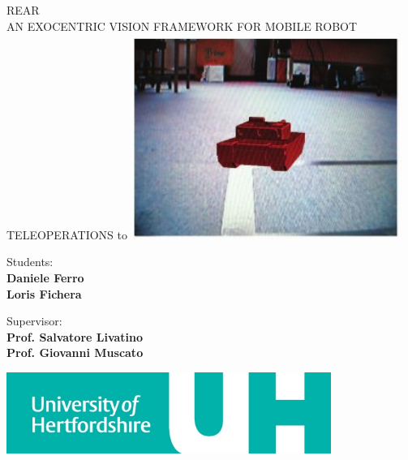 \begin{titlepage}
  \begin{center}
    \uppercase{ \textsf{
        \LARGE{REAR} \\ 
        \vspace{0.5truecm}
        \large{an exocentric vision framework for mobile robot teleoperations}
    }}
    \hbox to \textwidth{\hrulefill}
    \vfill
    \includegraphics[width=250pt]{img/virtual_exocentric.jpg}
    \vfill
    
    \begin{flushright}
      \textsf{Students:} \\
      \textsf{\textbf{Daniele Ferro}} \\                      
      \textsf{\textbf{Loris Fichera}}
      \vspace{0.5 truecm}
                
      \textsf{Supervisor:} \\
      \textsf{\textbf{Prof. Salvatore Livatino }}\\
      \textsf{\textbf{Prof. Giovanni Muscato }}\\
    \end{flushright}
    
    \vspace{0.5 truecm}
    \hfill \includegraphics[width=300pt]{img/uni_logo.jpg}  %
    
  \end{center}
  
\end{titlepage}

\setlength{\baselineskip}{1.3\baselineskip} %

\tableofcontents

\newpage

